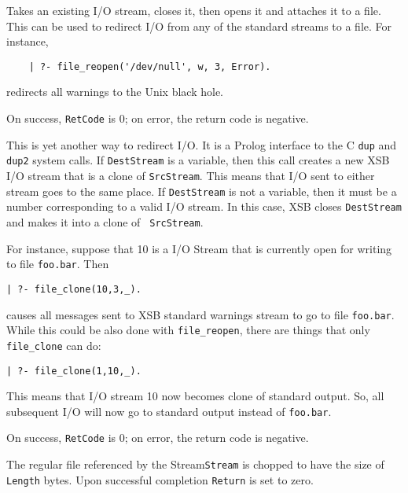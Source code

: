 \begin{description}

%
    Takes an existing I/O stream, closes it, then opens it and
    attaches it to a file. This can be used to redirect I/O from any of the
    standard streams to a file. For instance, 
\begin{verbatim}
    | ?- file_reopen('/dev/null', w, 3, Error).
\end{verbatim}
    redirects all warnings to the Unix black hole. 

    On success, {\tt RetCode} is 0; on error, the return code is negative.


%
This is yet another way to redirect I/O. It is a Prolog interface to
the C {\tt dup} and {\tt dup2} system calls. If {\tt DestStream} is a
variable, then this call creates a new XSB I/O stream that is a clone
of {\tt SrcStream}. This means that I/O sent to either stream goes
to the same place. If {\tt DestStream} is not a variable, then it must
be a number corresponding to a valid I/O stream. In this case, XSB
closes {\tt DestStream} and makes it into a clone of {\tt
SrcStream}. 

For instance, suppose that 10 is a I/O Stream that is currently open
for writing to file {\tt foo.bar}.  Then 
\begin{verbatim} 
| ?- file_clone(10,3,_).  
\end{verbatim} 
causes all messages sent to XSB standard warnings stream to go to file
{\tt foo.bar}. While this could be also done with {\tt file\_reopen},
there are things that only {\tt file\_clone} can do: 
\begin{verbatim} 
| ?- file_clone(1,10,_). 
\end{verbatim} 
This means that I/O stream 10 now becomes clone of standard
output. So, all subsequent I/O will now go to standard output instead
of {\tt foo.bar}.

On success, {\tt RetCode} is 0; on error, the return code is negative.


    The regular file  referenced by the Stream{\tt Stream}
    is chopped to have the size of {\tt Length} bytes. Upon successful
    completion {\tt Return} is set to zero.


\end{description}
